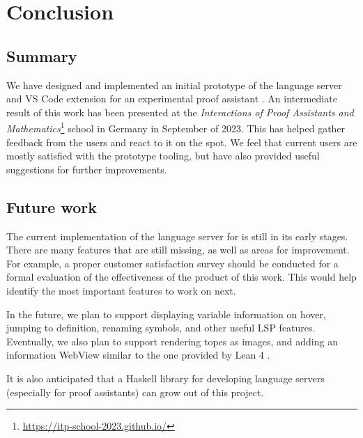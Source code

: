 \chapter{Conclusion}
\label{chap:conclusion}

\section{Summary}

We have designed and implemented an initial prototype of the language server
and VS Code extension for an experimental proof assistant \Rzk{}.
An intermediate result of this work has been presented at the
\textit{Interactions of Proof Assistants and Mathematics}\footnote{\url{https://itp-school-2023.github.io/}}
school in Germany in September of 2023.
This has helped gather feedback from the users and react to it on the spot.
We feel that current users are mostly satisfied with the prototype tooling,
but have also provided useful suggestions for further improvements.

\section{Future work}

The current implementation of the language server for \Rzk{} is still in its early stages.
There are many features that are still missing, as well as areas for improvement.
For example, a proper customer satisfaction survey should be conducted for a formal
evaluation of the effectiveness of the product of this work.
This would help identify the most important features to work on next.

In the future, we plan to support displaying variable information on hover,
jumping to definition, renaming symbols, and other useful LSP features.
Eventually, we also plan to support rendering topes as images,
and adding an information WebView similar to the one provided by Lean 4 \cite{Nawrocki2023}.

It is also anticipated that a Haskell library for developing language servers
(especially for proof assistants) can grow out of this project.
